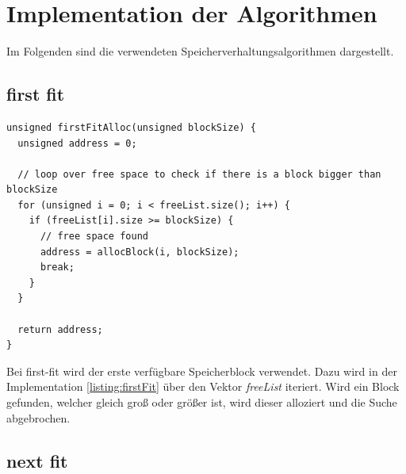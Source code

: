 

\section{Implementation der Algorithmen}

Im Folgenden sind die verwendeten Speicherverhaltungsalgorithmen dargestellt.

\subsection{first fit}

\begin{lstlisting}[caption={first fit C-Implementation}, label=listing:firstFit]
unsigned firstFitAlloc(unsigned blockSize) {
  unsigned address = 0;

  // loop over free space to check if there is a block bigger than blockSize
  for (unsigned i = 0; i < freeList.size(); i++) {
    if (freeList[i].size >= blockSize) {
      // free space found
      address = allocBlock(i, blockSize);
      break;
    }
  }

  return address;
}
\end{lstlisting}

Bei first-fit wird der erste verfügbare Speicherblock verwendet. Dazu wird in der Implementation \ref{listing:firstFit} über den Vektor \textit{freeList} iteriert. Wird ein Block gefunden, welcher gleich groß oder größer ist, wird dieser alloziert und die Suche abgebrochen.

\subsection{next fit}

